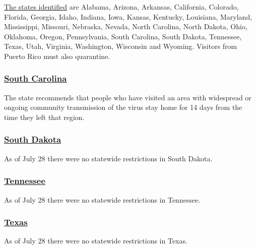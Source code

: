 \href{https://docs.google.com/spreadsheets/d/e/2PACX-1vSUCk9FlHBoJt5ZO0U6PKTTY7jHH8V4MovED0WiqpTTixdgMSCnUWI25xX5DCmQmtLknzu7Bo0jwY02/pubhtml?gid=0\&single=true}{The
states identified} are Alabama, Arizona, Arkansas, California, Colorado,
Florida, Georgia, Idaho, Indiana, Iowa, Kansas, Kentucky, Louisiana,
Maryland, Mississippi, Missouri, Nebraska, Nevada, North Carolina, North
Dakota, Ohio, Oklahoma, Oregon, Pennsylvania, South Carolina, South
Dakota, Tennessee, Texas, Utah, Virginia, Washington, Wisconsin and
Wyoming. Visitors from Puerto Rico must also quarantine.

\hypertarget{south-carolina}{%
\subsubsection{\texorpdfstring{\href{https://scdhec.gov/infectious-diseases/viruses/coronavirus-disease-2019-covid-19/travelers-covid-19}{South
Carolina}}{South Carolina}}\label{south-carolina}}

The state recommends that people who have visited an area with
widespread or ongoing community transmission of the virus stay home for
14 days from the time they left that region.

\hypertarget{south-dakota}{%
\subsubsection{\texorpdfstring{\href{https://www.travelsouthdakota.com/coronavirus-covid-19}{South
Dakota}}{South Dakota}}\label{south-dakota}}

As of July 28 there were no statewide restrictions in South Dakota.

\hypertarget{tennessee}{%
\subsubsection{\texorpdfstring{\href{https://www.tnvacation.com/articles/tennessee-travel-amid-coronavirus}{Tennessee}}{Tennessee}}\label{tennessee}}

As of July 28 there were no statewide restrictions in Tennessee.

\hypertarget{texas}{%
\subsubsection{\texorpdfstring{\href{https://gov.texas.gov/travel-texas/page/covid19}{Texas}}{Texas}}\label{texas}}

As of July 28 there were no statewide restrictions in Texas.

